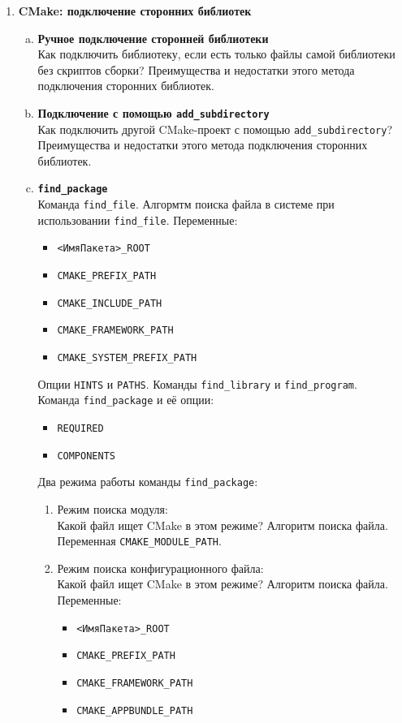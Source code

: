 \documentclass{article}
\begin{document}
\begin{enumerate}
\begin{enumerate}[a.]
\end{enumerate}





\newpage
\item \textbf{CMake: подключение сторонних библиотек}
\begin{enumerate}[a.]
\item \textbf{Ручное подключение сторонней библиотеки}\\
Как подключить библиотеку, если есть только файлы самой библиотеки без скриптов сборки?
Преимущества и недостатки этого метода подключения сторонних библиотек.

\item \textbf{Подключение с помощью \texttt{add\_subdirectory}}\\
Как подключить другой CMake-проект с помощью \texttt{add\_subdirectory}?
Преимущества и недостатки этого метода подключения сторонних библиотек.

\item \textbf{\texttt{find\_package}}\\
Команда \texttt{find\_file}. Алгормтм поиска файла в системе при использовании \texttt{find\_file}. Переменные:
\begin{itemize}
\item \texttt{<ИмяПакета>\_ROOT}
\item \texttt{CMAKE\_PREFIX\_PATH}
\item \texttt{CMAKE\_INCLUDE\_PATH}
\item \texttt{CMAKE\_FRAMEWORK\_PATH}
\item \texttt{CMAKE\_SYSTEM\_PREFIX\_PATH}
\end{itemize}
Опции \texttt{HINTS} и \texttt{PATHS}. Команды \texttt{find\_library} и \texttt{find\_program}.\\
Команда \texttt{find\_package} и её опции:
\begin{itemize}
\item \texttt{REQUIRED}
\item \texttt{COMPONENTS}
\end{itemize}
Два режима работы команды \texttt{find\_package}:
\begin{enumerate}
\item Режим поиска модуля:\\
Какой файл ищет CMake в этом режиме? Алгоритм поиска файла. Переменная \texttt{CMAKE\_MODULE\_PATH}.
\item Режим поиска конфигурационного файла:\\
Какой файл ищет CMake в этом режиме? Алгоритм поиска файла. Переменные:
\begin{itemize}
\item \texttt{<ИмяПакета>\_ROOT}
\item \texttt{CMAKE\_PREFIX\_PATH}
\item \texttt{CMAKE\_FRAMEWORK\_PATH}
\item \texttt{CMAKE\_APPBUNDLE\_PATH}
\end{itemize}
\end{enumerate}


\end{enumerate}
\end{enumerate}
\end{document}
